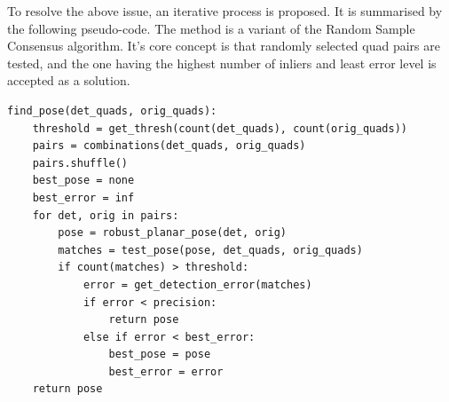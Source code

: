 To resolve the above issue, an iterative process is proposed.
It is summarised by the following pseudo-code.
The method is a variant of the Random Sample Consensus algorithm.
It's core concept is that randomly selected quad pairs are tested, and the one having the highest number of inliers and least error level is accepted as a solution.
\begin{lstlisting}
find_pose(det_quads, orig_quads):
    threshold = get_thresh(count(det_quads), count(orig_quads))
    pairs = combinations(det_quads, orig_quads)
    pairs.shuffle()
    best_pose = none
    best_error = inf
    for det, orig in pairs:
        pose = robust_planar_pose(det, orig)
        matches = test_pose(pose, det_quads, orig_quads)
        if count(matches) > threshold:
            error = get_detection_error(matches)
            if error < precision:
                return pose
            else if error < best_error:
                best_pose = pose
                best_error = error
    return pose
\end{lstlisting}


